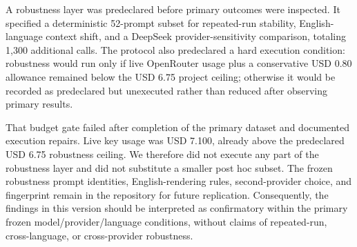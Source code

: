 A robustness layer was predeclared before primary outcomes were inspected. It specified a deterministic 52-prompt subset for repeated-run stability, English-language context shift, and a DeepSeek provider-sensitivity comparison, totaling 1,300 additional calls. The protocol also predeclared a hard execution condition: robustness would run only if live OpenRouter usage plus a conservative USD 0.80 allowance remained below the USD 6.75 project ceiling; otherwise it would be recorded as predeclared but unexecuted rather than reduced after observing primary results.

That budget gate failed after completion of the primary dataset and documented execution repairs. Live key usage was USD 7.100, already above the predeclared USD 6.75 robustness ceiling. We therefore did not execute any part of the robustness layer and did not substitute a smaller post hoc subset. The frozen robustness prompt identities, English-rendering rules, second-provider choice, and fingerprint remain in the repository for future replication. Consequently, the findings in this version should be interpreted as confirmatory within the primary frozen model/provider/language conditions, without claims of repeated-run, cross-language, or cross-provider robustness.